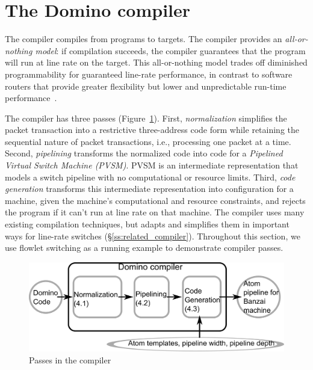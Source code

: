 \section{The Domino compiler}
\label{s:compiler}


The \pktlanguage compiler compiles from \pktlanguage programs to \absmachine
targets. The compiler provides an {\em all-or-nothing model}: if compilation
succeeds, the compiler guarantees that the program will run at line rate on the
target. This all-or-nothing model trades off diminished programmability for
guaranteed line-rate performance, in contrast to software routers that provide
greater flexibility but lower and unpredictable run-time
performance~\cite{dobrescu2012}.


The \pktlanguage compiler has three passes (Figure~\ref{fig:passes}).  First,
\textit{normalization} simplifies the packet transaction into a restrictive
three-address code form while retaining the sequential nature of packet
transactions, i.e., processing one packet at a time. Second, \textit{pipelining} transforms the normalized code into
code for a \textit{Pipelined Virtual Switch Machine (PVSM)}. PVSM is an
intermediate representation that models a switch pipeline with no computational
or resource limits. Third, \textit{code generation} transforms this
intermediate representation into configuration for a \absmachine machine, given
 the machine's computational and resource constraints, and rejects the
program if it can't run at line rate on that \absmachine machine.  The
\pktlanguage compiler uses many existing compilation techniques, but adapts and
simplifies them in important ways for line-rate switches
(\S\ref{ss:related_compiler}). Throughout this section, we use flowlet
switching as a running example to demonstrate compiler passes.

\begin{figure}[!t]
  \includegraphics[width=\columnwidth]{compiler.pdf}
  \caption{Passes in the \pktlanguage compiler}
  \label{fig:passes}
\end{figure}

